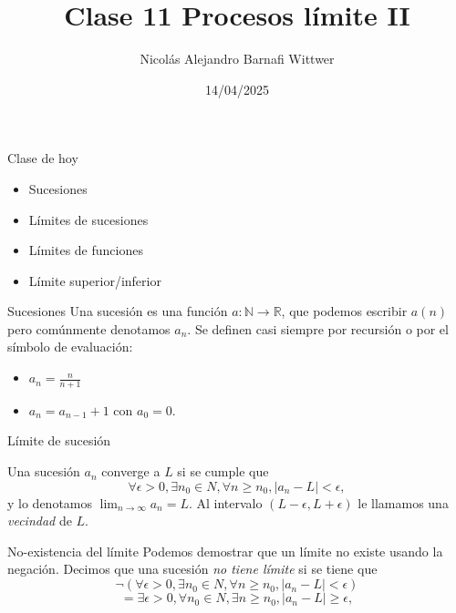 \documentclass[14pt,aspectratio=169,xcolor=dvipsnames]{beamer}
\title[short title]{Clase 11 Procesos límite II}
\subtitle{}
\author[NA Barnafi] {Nicolás Alejandro Barnafi Wittwer}
\institute[UC|CMM] 
{
    Pontificia Universidad Católica de Chile \\
    Centro de Modelamiento Matemático
}
\date{14/04/2025}
\newcommand{\R}{\mathbb{R}}
\begin{document}
\begin{frame}
    \maketitle
\end{frame}
\begin{frame}{Clase de hoy}
    \begin{itemize}
        \item Sucesiones
        \item Límites de sucesiones
        \item Límites de funciones
        \item Límite superior/inferior
    \end{itemize}

    \vspace{1cm}
\end{frame}
\begin{frame}{Sucesiones}
    Una sucesión es una función $a:\mathbb N\to \R$, que podemos escribir $a(n)$ pero comúnmente denotamos $a_n$. Se definen casi siempre por recursión o por el símbolo de evaluación:
    \begin{itemize}
        \item $a_n = \frac{n}{n+1}$
        \item $a_n = a_{n-1} + 1$ con $a_0 = 0$. 
    \end{itemize}
\end{frame}
\begin{frame}{Límite de sucesión}
    \begin{block}{}
        Una sucesión $a_n$ converge a $L$ si se cumple que
            $$ \forall \epsilon > 0, \exists n_0\in N, \forall n\geq n_0, |a_n - L | < \epsilon, $$
            y lo denotamos $\lim_{n\to\infty} a_n = L$. Al intervalo $(L-\epsilon, L+\epsilon)$ le llamamos una \emph{vecindad} de $L$.
    \end{block}
\end{frame}
\begin{frame}{No-existencia del límite}
    Podemos demostrar que un límite no existe usando la negación. Decimos que una sucesión \emph{no tiene límite} si se tiene que
            $$ \neg(\forall \epsilon > 0, \exists n_0\in N, \forall n\geq n_0, |a_n - L | < \epsilon) $$
            $$ =\exists \epsilon > 0, \forall n_0\in N, \exists n\geq n_0, |a_n - L | \geq \epsilon, $$
\end{frame}
\end{document}
